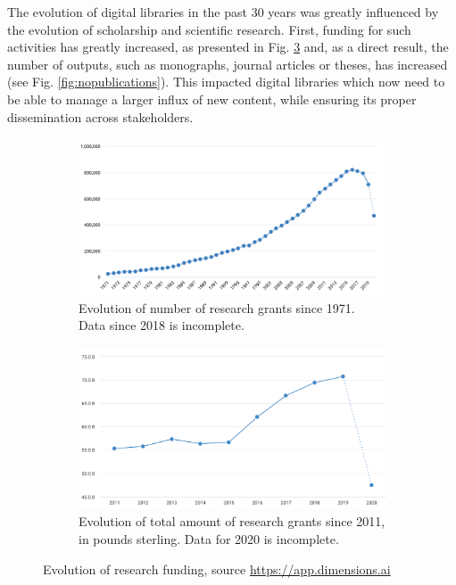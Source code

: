 The evolution of digital libraries in the past 30 years was greatly influenced by the evolution of scholarship and scientific research. First, funding for such activities has greatly increased, as presented in Fig. \ref{fig:fundig} and, as a direct result, the number of outputs, such as monographs, journal articles or theses, has increased (see Fig. \ref{fig:nopublications}). This impacted digital libraries which now need to be able to manage a larger influx of new content, while ensuring its proper dissemination across stakeholders. 
\begin{figure}[ht!]
\centering
\begin{subfigure}{0.9\textwidth}
  \includegraphics[width=1\linewidth]{figures/no_grants.png}  
  \caption{Evolution of number of research grants since 1971. Data since 2018 is incomplete.}
  \label{subfig:grants}
\end{subfigure}
\begin{subfigure}{0.9\textwidth}
  \includegraphics[width=1\linewidth]{figures/funding.png}  
  \caption{Evolution of total amount of research grants since 2011, in pounds sterling. Data for 2020 is incomplete.}
  \label{subfig:grantstotal}
\end{subfigure}
\caption{Evolution of research funding, source \url{https://app.dimensions.ai}}
\label{fig:fundig}
\end{figure}

